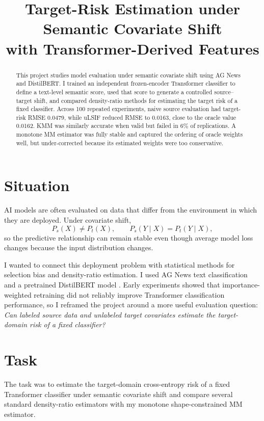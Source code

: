 \documentclass[11pt]{article}
\title{\textbf{Target-Risk Estimation under Semantic Covariate Shift\\with Transformer-Derived Features}}
\author{}
\date{}
\begin{document}
\maketitle
\vspace{-1.7em}

\begin{abstract}
This project studies model evaluation under semantic covariate shift using AG News and DistilBERT. I trained an independent frozen-encoder Transformer classifier to define a text-level semantic score, used that score to generate a controlled source--target shift, and compared density-ratio methods for estimating the target risk of a fixed classifier. Across 100 repeated experiments, naive source evaluation had target-risk RMSE 0.0479, while uLSIF reduced RMSE to 0.0163, close to the oracle value 0.0162. KMM was similarly accurate when valid but failed in 6\% of replications. A monotone MM estimator was fully stable and captured the ordering of oracle weights well, but under-corrected because its estimated weights were too conservative.
\end{abstract}

\section{Situation}

AI models are often evaluated on data that differ from the environment in which they are deployed. Under covariate shift,
\[
P_s(X)\neq P_t(X), \qquad P_s(Y\mid X)=P_t(Y\mid X),
\]
so the predictive relationship can remain stable even though average model loss changes because the input distribution changes.

I wanted to connect this deployment problem with statistical methods for selection bias and density-ratio estimation. I used AG News text classification and a pretrained DistilBERT model \citep{sanh2019distilbert,zhang2015character}. Early experiments showed that importance-weighted retraining did not reliably improve Transformer classification performance, so I reframed the project around a more useful evaluation question: \emph{Can labeled source data and unlabeled target covariates estimate the target-domain risk of a fixed classifier?}

\section{Task}

The task was to estimate the target-domain cross-entropy risk of a fixed Transformer classifier under semantic covariate shift and compare several standard density-ratio estimators with my monotone shape-constrained MM estimator.
\end{document}
